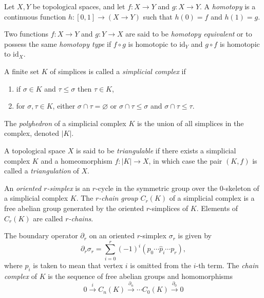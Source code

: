 \documentclass{article}
\begin{document}
\begin{defn}
Let $X, Y$ be topological spaces, and let $f : X \to Y$ and
$g : X \to Y$. A \emph{homotopy} is a continuous function
$h : [0,1] \to (X \to Y)$ such that $h(0) = f$ and $h(1) = g$.

Two functions $f : X \to Y$ and $g : Y \to X$ are said to be
\emph{homotopy equivalent} or to possess the same \emph{homotopy type}
if $f \circ g$ is homotopic to $\mathrm{id}_Y$ and $g \circ f$ is
homotopic to
$\mathrm{id}_X$.
\end{defn}

\begin{defn}
A finite set $K$ of simplices is called a \emph{simplicial complex} if
\begin{enumerate}
  \item{if $\sigma \in K$ and $\tau \leq \sigma$ then
        $\tau \in K$,}
  \item{for $\sigma, \tau \in K$, either $\sigma \cap \tau =
      \varnothing$ or $\sigma \cap \tau \leq \sigma$ and $\sigma \cap
      \tau \leq \tau$.
       }
\end{enumerate}
\end{defn}

\begin{defn}
The \emph{polyhedron} of a simplicial complex $K$ is the union of all
simplices in the complex, denoted $|K|$.

A topological space $X$ is
said to be \emph{triangulable} if there exists a simplicial complex
$K$ and a homeomorphism $f : |K| \to X$, in which case the pair
$(K, f)$ is called a \emph{triangulation} of $X$.
\end{defn}

\begin{defn}
An \emph{oriented $r$-simplex} is an $r$-cycle in the symmetric group
over the $0$-skeleton of a simplicial complex $K$. The
\emph{$r$-chain group} $C_r(K)$ of a simplicial complex is a free
abelian group generated by the oriented $r$-simplices of $K$. Elements
of $C_r(K)$ are called \emph{$r$-chains}.
\end{defn}

\begin{defn}
The boundary operator $\partial_r$ on an oriented $r$-simplex
$\sigma_r$ is given by
$$
\partial_r \sigma_r
= \sum_{i = 0}^r (-1)^i(p_0 \cdots \hat{p}_i \cdots p_r),
$$
where $\hat{p}_i$ is taken to mean that vertex $i$ is omitted from the
$i$-th term. The \emph{chain complex} of $K$ is the sequence of
free abelian groups and homomorphisms
$$
0      \xrightarrow{i}
C_n(K) \xrightarrow{\partial_n}
\cdots
C_0(K) \xrightarrow{\partial_0}
0
$$
\end{defn}
\end{document}
